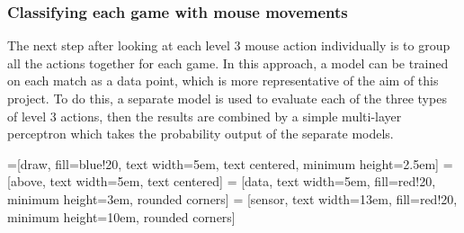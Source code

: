 \documentclass[Report.tex]{subfiles}
\begin{document}
\subsubsection{Classifying each game with mouse movements}
The next step after looking at each level 3 mouse action individually is to group all the actions together for each game. In this approach, a model can be trained on each match as a data point, which is more representative of the aim of this project. To do this, a separate model is used to evaluate each of the three types of level 3 actions, then the results are combined by a simple multi-layer perceptron which takes the probability output of the separate models. 



=[draw, fill=blue!20, text width=5em, 
    text centered, minimum height=2.5em]
 = [above, text width=5em, text centered]
 = [data, text width=5em, fill=red!20, 
    minimum height=3em, rounded corners]
 = [sensor, text width=13em, fill=red!20, 
    minimum height=10em, rounded corners]

\newcommand{\newMoveModel}[3]{
    \node (#2-model) at (2,#3) [model] {#1 Model};
    \path (#2-model.west)+(-\blockdist,0) node (#2) [data] {#1 actions}; 
   
    \path (#2-model.east)+(\blockdist,0) node (#2-output) [data] {Predictions};
    
    \path [draw, ->] (#2.east) -- node {} (#2-model);
    \path [draw, ->] (#2-model.east) -- node{} (#2-output);
}

\newcommand{\newGameModel}[3]{
    \node (#2-model) at (2,#3) [model] {#1 Model};
    \path (#2-model.west)+(-\blockdist,0) node (#2) [data] {#1 actions}; 
   
    \path [draw, ->] (#2.east) -- node {} (#2-model);
}
\end{document}
